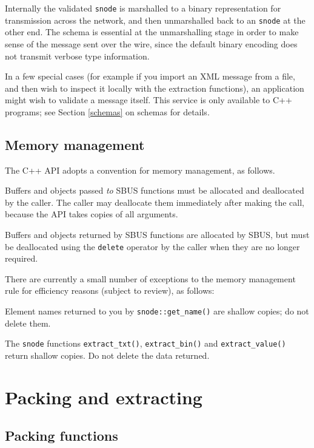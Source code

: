 \documentclass[12pt,a4paper,twoside]{article}
\renewcommand{\_}{\texttt{\symbol{95}}}
\begin{document}
Internally the validated \verb^snode^ is marshalled to a binary
representation for transmission across the network, and then
unmarshalled back to an \verb^snode^ at the other end.
The schema is essential at the unmarshalling stage in order to
make sense of the message sent over the wire, since the default
binary encoding does not transmit verbose type information.

In a few special cases (for example if you import an XML message
from a file, and then wish to inspect it locally with the extraction
functions), an application might wish to validate a message itself.
This service is only available to C++ programs; see Section \ref{schemas}
on schemas for details.

\subsection{Memory management}

The C++ API adopts a convention for memory management, as follows.

Buffers and objects passed \textit{to} SBUS functions must be allocated and
deallocated by the caller. The caller may deallocate them immediately
after making the call, because the API takes copies of all arguments.

Buffers and objects returned by SBUS functions are
allocated by SBUS, but must be deallocated using the \verb^delete^
operator by the caller when they are no longer required.

There are currently a small number of exceptions to the memory
management rule for efficiency reasons (subject to review), as follows:

\begin{bulletlist}
\item Element names returned to you by \verb^snode::get_name()^
      are shallow copies; do not delete them.
\item The \verb^snode^ functions \verb^extract_txt()^, \verb^extract_bin()^
      and \verb^extract_value()^ return shallow copies. Do not delete
		the data returned.
\end{bulletlist}

\section{Packing and extracting}

\subsection{Packing functions}
\end{document}

